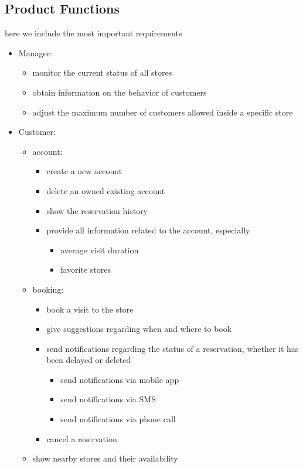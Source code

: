 \subsection{Product Functions}
here we include the most important requirements

\begin{itemize}
    \item Manager:
    \begin{itemize}
        \item monitor the current status of all stores
        \item obtain information on the behavior of customers
        \item adjust the maximum number of customers allowed inside a specific store
    \end{itemize}
    \item Customer:
    \begin{itemize}
        \item account:
        \begin{itemize}
            \item create a new account
            \item delete an owned existing account
            \item show the reservation history
            \item provide all information related to the account, especially
            \begin{itemize}
                \item average visit duration
                \item favorite stores
            \end{itemize}
        \end{itemize}

        \item booking:
        \begin{itemize}
            \item book a visit to the store
            \item give suggestions regarding when and where to book
            \item send notifications regarding the status of a reservation, whether it has been delayed or deleted
            \begin{itemize}
                \item send notifications via mobile app
                \item send notifications via SMS
                \item send notifications via phone call
            \end{itemize}
            \item cancel a reservation
        \end{itemize}

        \item show nearby stores and their availability
    \end{itemize}
\end{itemize}


